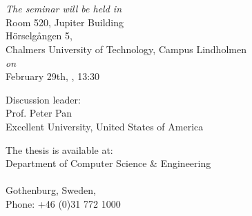 \documentclass[10pt,a4paper,onecolumn,english]{book}
\begin{document}
\frontmatter


\renewcommand{\thepage}{}

\thispagestyle{empty} %
\begin{center}
\end{center}



\begin{center} {\LARGE \textbf{\mytitle}}
\ifx\mysubtitle\undefined
\else
  \\
  \vspace{0.4cm}
  \textit{\large\mysubtitle}
\fi
\end{center}

\vspace{5mm}
\begin{center}
\textsc{\large\authorname} \\
\end{center}
\vspace{5mm}

\begin{center}
\textit{The seminar will be held in}\\
\vskip 2mm
Room 520, Jupiter Building \\
H\"{o}rselg\aa ngen 5,\\
Chalmers University of Technology, Campus Lindholmen\\
\vskip 1mm
\textit{on}\\
\vskip 1mm
February 29th, \currentyear, 13:30\\

\vspace{1cm}

Discussion leader:\\
Prof. Peter Pan\\
Excellent University, United States of America
\end{center}

\vspace{1cm}


\begin{center}
The thesis is available at:\\
Department of Computer Science \& Engineering\\
\chalIgu\\
Gothenburg, Sweden, \currentyear\\
\vspace{1cm}
Phone: +46 (0)31 772 1000
\end{center}
\end{document}
